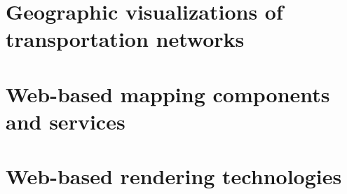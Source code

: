 

  \section{Geographic visualizations of transportation networks}
    \label{sec:overv:geovs}

  \section{Web-based mapping components and services}
    \label{sec:overv:webmp}

  \section{Web-based rendering technologies}
    \label{sec:overv:webrn}





